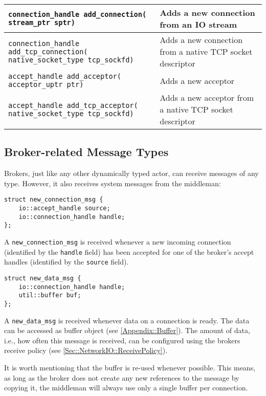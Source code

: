 {\begin{tabular*}{\textwidth}{m{}m{}}
  \hline
  \lstinline^connection_handle add_connection(^ \lstinline^stream_ptr sptr)^ & Adds a new connection from an IO stream \\
  \hline
  \lstinline^connection_handle add_tcp_connection(^ \lstinline^native_socket_type tcp_sockfd)^ & Adds a new connection from a native TCP socket descriptor \\
  \hline
  \lstinline^accept_handle add_acceptor(^ \lstinline^acceptor_uptr ptr)^ & Adds a new acceptor \\
  \hline
  \lstinline^accept_handle add_tcp_acceptor(^ \lstinline^native_socket_type tcp_sockfd)^ & Adds a new acceptor from a native TCP socket descriptor \\
  \hline
\end{tabular*}
}

\clearpage
\subsection{Broker-related Message Types}

Brokers, just like any other dynamically typed actor, can receive messages of any type.
However, it also receives system messages from the middleman:

\begin{lstlisting}
struct new_connection_msg {
    io::accept_handle source;
    io::connection_handle handle;
};
\end{lstlisting}

A \lstinline^new_connection_msg^ is received whenever a new incoming connection (identified by the \lstinline^handle^ field) has been accepted for one of the broker's accept handles (identified by the \lstinline^source^ field).

\begin{lstlisting}
struct new_data_msg {
    io::connection_handle handle;
    util::buffer buf;
};
\end{lstlisting}

A \lstinline^new_data_msg^ is received whenever data on a connection is ready.
The data can be accessed as buffer object (see \ref{Appendix::Buffer}).
The amount of data, i.e., how often this message is received, can be configured using the brokers receive policy (see \ref{Sec::NetworkIO::ReceivePolicy}).

It is worth mentioning that the buffer is re-used whenever possible.
This means, as long as the broker does not create any new references to the message by copying it, the middleman will always use only a single buffer per connection.

